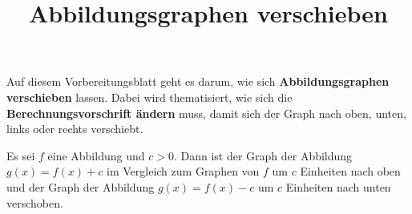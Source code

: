 \documentclass[]{uebungsblatt}
\title{Abbildungsgraphen verschieben}
\begin{document}
\maketitle
\begin{contents}
    Auf diesem Vorbereitungsblatt geht es darum, wie sich \textbf{Abbildungsgraphen verschieben} lassen. Dabei wird thematisiert, wie sich die \textbf{Berechnungsvorschrift ändern} muss, damit sich der Graph nach oben, unten, links oder rechts verschiebt.
\end{contents}
\begin{remark}{}
    Es sei $f$ eine Abbildung und $c>0$. Dann ist der Graph der Abbildung $g(x)=f(x)+c$ im Vergleich zum Graphen von $f$ um $c$ Einheiten nach oben und der Graph der Abbildung $g(x)=f(x)-c$ um $c$ Einheiten nach unten verschoben.
\end{remark}
\end{document}
